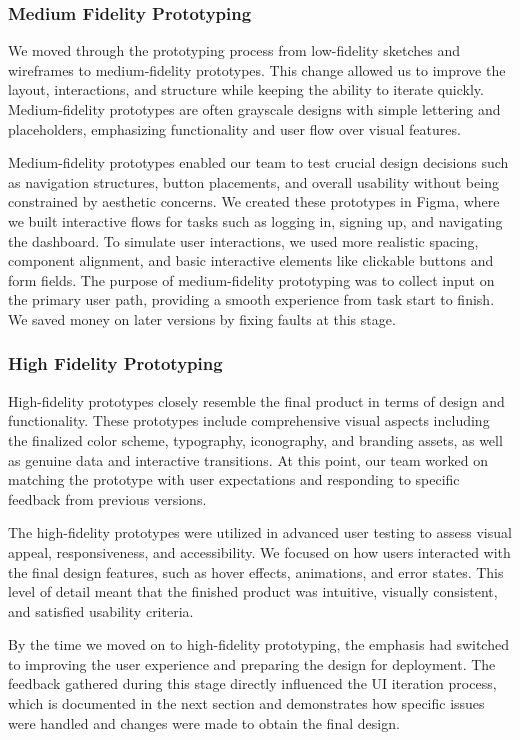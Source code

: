\subsubsection{Medium Fidelity Prototyping}

We moved through the prototyping process from low-fidelity sketches and wireframes to medium-fidelity prototypes. This change allowed us to improve the layout, interactions, and structure while keeping the ability to iterate quickly. Medium-fidelity prototypes are often grayscale designs with simple lettering and placeholders, emphasizing functionality and user flow over visual features.

Medium-fidelity prototypes enabled our team to test crucial design decisions such as navigation structures, button placements, and overall usability without being constrained by aesthetic concerns. We created these prototypes in Figma, where we built interactive flows for tasks such as logging in, signing up, and navigating the dashboard. To simulate user interactions, we used more realistic spacing, component alignment, and basic interactive elements like clickable buttons and form fields.
The purpose of medium-fidelity prototyping was to collect input on the primary user path, providing a smooth experience from task start to finish. We saved money on later versions by fixing faults at this stage.

\subsubsection{High Fidelity Prototyping}
High-fidelity prototypes closely resemble the final product in terms of design and functionality. These prototypes include comprehensive visual aspects including the finalized color scheme, typography, iconography, and branding assets, as well as genuine data and interactive transitions. At this point, our team worked on matching the prototype with user expectations and responding to specific feedback from previous versions.

The high-fidelity prototypes were utilized in advanced user testing to assess visual appeal, responsiveness, and accessibility. We focused on how users interacted with the final design features, such as hover effects, animations, and error states. This level of detail meant that the finished product was intuitive, visually consistent, and satisfied usability criteria.

By the time we moved on to high-fidelity prototyping, the emphasis had switched to improving the user experience and preparing the design for deployment. The feedback gathered during this stage directly influenced the UI iteration process, which is documented in the next section and demonstrates how specific issues were handled and changes were made to obtain the final design.



